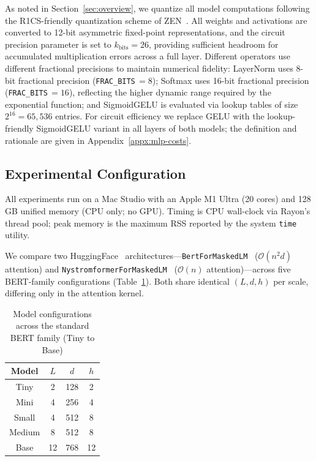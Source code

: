 \documentclass[runningheads]{llncs}
\begin{document}
\label{subsec:quantization}
As noted in Section~\ref{sec:overview}, we quantize all model computations following the R1CS-friendly quantization scheme of ZEN~\cite{ZEN}. All weights and activations are converted to 12-bit asymmetric fixed-point representations, and the circuit precision parameter is set to $k_{\text{bits}} = 26$, providing sufficient headroom for accumulated multiplication errors across a full layer. Different operators use different fractional precisions to maintain numerical fidelity: LayerNorm uses 8-bit fractional precision (\texttt{FRAC\_BITS}$\,= 8$); Softmax uses 16-bit fractional precision (\texttt{FRAC\_BITS}$\,= 16$), reflecting the higher dynamic range required by the exponential function; and SigmoidGELU is evaluated via lookup tables of size $2^{16} = 65{,}536$ entries.
For circuit efficiency we replace GELU with the lookup-friendly SigmoidGELU variant in all layers of both models; the definition and rationale are given in Appendix~\ref{appx:mlp-costs}.

\subsection{Experimental Configuration}
\label{subsec:configuration}

All experiments run on a Mac Studio with an Apple M1 Ultra (20 cores) and 128\,GB unified memory (CPU only; no GPU). Timing is CPU wall-clock via Rayon's thread pool; peak memory is the maximum RSS reported by the system \texttt{time} utility.

We compare two HuggingFace~\cite{HuggingFace} architectures---\texttt{BertForMaskedLM}~\cite{BERT} ($\mathcal{O}(n^2d)$ attention) and \texttt{NystromformerForMaskedLM}~\cite{Nystromformer} ($\mathcal{O}(n)$ attention)---across five BERT-family configurations (Table~\ref{tab:model_configs}). Both share identical $(L, d, h)$ per scale, differing only in the attention kernel.
\begin{table}[t]
    \centering
    \footnotesize
    \begin{tabular}{c c c c}
    \hline
    Model & $L$ & $d$ & $h$ \\
    \hline
    Tiny   & 2  & 128 & 2 \\
    Mini   & 4  & 256 & 4 \\
    Small  & 4  & 512 & 8 \\
    Medium & 8  & 512 & 8 \\
    Base   & 12 & 768 & 12 \\
    \hline
    \end{tabular}
    \caption{Model configurations across the standard BERT family (Tiny to Base)}
    \label{tab:model_configs}
\end{table}
\end{document}
